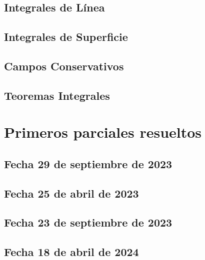 \documentclass[10pt, a4paper]{report}
\begin{document}
        \section{Integrales de L\'inea}
            
        
        \section{Integrales de Superficie}
            
      
        \section{Campos Conservativos}
            
       
        \section{Teoremas Integrales}
            


    \chapter{Primeros parciales resueltos}
        \section{Fecha 29 de septiembre de 2023}
            

        \newpage
        \section{Fecha 25 de abril de 2023}
            





            \newpage
        \section{Fecha 23 de septiembre de 2023}
            


            \newpage
        \section{Fecha 18 de abril de 2024}
            
            
\end{document}
